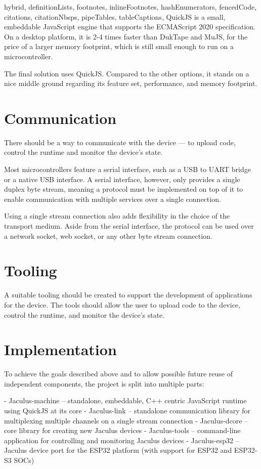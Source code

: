 \begin{markdown*}{%
  hybrid,
  definitionLists,
  footnotes,
  inlineFootnotes,
  hashEnumerators,
  fencedCode,
  citations,
  citationNbsps,
  pipeTables,
  tableCaptions,
}
QuickJS is a small, embeddable JavaScript engine that supports the ECMAScript 2020 specification. On a desktop platform, it is 2-4 times faster\cite{quickjs} than DukTape and MuJS, for the price of a larger memory footprint, which is still small enough to run on a microcontroller.

The final solution uses QuickJS. Compared to the other options, it stands on a nice middle ground regarding its feature set, performance, and memory footprint.

\section{Communication}

There should be a way to communicate with the device --- to upload code, control the runtime and monitor the device's state.

Most microcontrollers feature a serial interface, such as a USB to UART bridge or a native USB interface. A serial interface, however, only provides a single duplex byte stream, meaning a protocol must be implemented on top of it to enable communication with multiple services over a single connection.

Using a single stream connection also adds flexibility in the choice of the transport medium. Aside from the serial interface, the protocol can be used over a network socket, web socket, or any other byte stream connection.

\section{Tooling}

A suitable tooling should be created to support the development of applications for the device. The tools should allow the user to upload code to the device, control the runtime, and monitor the device's state.

\section{Implementation}

To achieve the goals described above and to allow possible future reuse of independent components, the project is split into multiple parts:

  - Jaculus-machine -- standalone, embeddable, C++ centric JavaScript runtime using QuickJS at its core
  - Jaculus-link -- standalone communication library for multiplexing multiple channels on a single stream connection
  - Jaculus-dcore -- core library for creating new Jaculus devices
  - Jaculus-tools -- command-line application for controlling and monitoring Jaculus devices
  - Jaculus-esp32 -- Jaculus device port for the ESP32 platform (with support for ESP32 and ESP32-S3 SOCs)



\end{markdown*}
